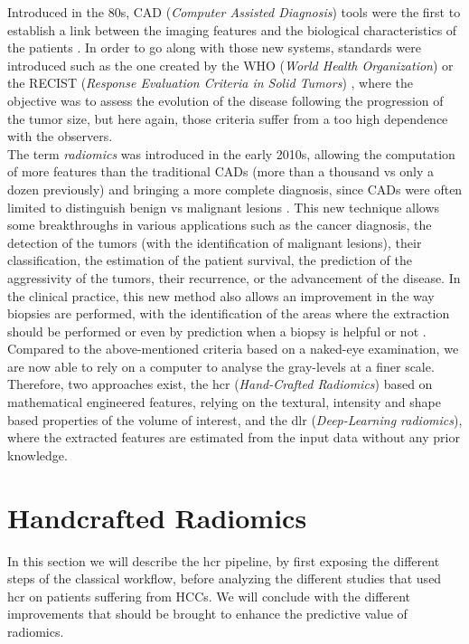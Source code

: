 Introduced in the 80s, CAD (\emph{Computer Assisted Diagnosis}) tools
were the first to establish a link between the
imaging features and the biological characteristics of the patients
\cite{Doi2007}. In order to go along with those new systems, standards were introduced
such as the one created by the WHO (\emph{World Health Organization}) 
or the RECIST (\emph{Response Evaluation Criteria in Solid Tumors})
\cite{Jaffe2006}, where the objective was to assess the
evolution of the disease following the progression of the tumor size,
but here again, those criteria suffer from a too high dependence with
the observers.\\
The term \emph{radiomics} was introduced in the early 2010s, allowing
the computation of more features than the traditional CADs (more
than a thousand vs only a dozen previously) and bringing a more complete
diagnosis, since CADs were often limited to distinguish benign vs
malignant lesions \cite{Afshar2018}.
This new technique allows some breakthroughs in various applications
such as the cancer diagnosis, the detection of the tumors (with the
identification of malignant lesions), their classification, the
estimation of the patient survival, the prediction of the aggressivity
of the tumors, their recurrence, or the advancement of the disease.
In the clinical practice, this new method also allows an improvement in
the way biopsies are performed, with the identification of the areas
where the extraction should be performed \cite{Gillies2016}
or even by prediction when a biopsy is helpful or not \cite{Liu2016}.\\
Compared to the above-mentioned criteria based on a naked-eye examination,
we are now able to rely on a computer to analyse the gray-levels at a
finer scale. Therefore, two approaches exist, the \ac{hcr} (\emph{Hand-Crafted
Radiomics}) based on mathematical engineered features, relying on the
textural, intensity and shape based properties of the volume of interest, and
the \ac{dlr} (\emph{Deep-Learning radiomics}), where the extracted features
are estimated from the input data without any prior
knowledge.

\section{Handcrafted Radiomics }\label{handcrafted-radiomics}

In this section we will describe the \ac{hcr} pipeline, by first
exposing the different steps of the classical workflow, before analyzing
the different studies that used \ac{hcr} on patients suffering from
HCCs. We will conclude with the different improvements that
should be brought to enhance the predictive value of radiomics.

